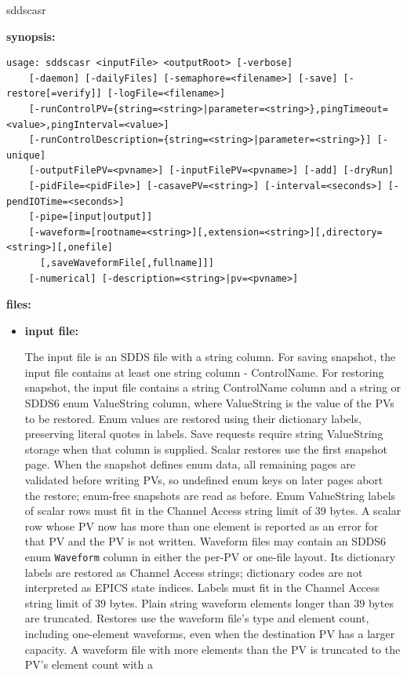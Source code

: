 \begin{sddsprog}{sddscasr}
\item \textbf{synopsis:}
\begin{verbatim}
usage: sddscasr <inputFile> <outputRoot> [-verbose]
    [-daemon] [-dailyFiles] [-semaphore=<filename>] [-save] [-restore[=verify]] [-logFile=<filename>]
    [-runControlPV={string=<string>|parameter=<string>},pingTimeout=<value>,pingInterval=<value>]
    [-runControlDescription={string=<string>|parameter=<string>}] [-unique]
    [-outputFilePV=<pvname>] [-inputFilePV=<pvname>] [-add] [-dryRun]
    [-pidFile=<pidFile>] [-casavePV=<string>] [-interval=<seconds>] [-pendIOTime=<seconds>]
    [-pipe=[input|output]] 
    [-waveform=[rootname=<string>][,extension=<string>][,directory=<string>][,onefile]
      [,saveWaveformFile[,fullname]]]
    [-numerical] [-description=<string>|pv=<pvname>]
\end{verbatim}
\item \textbf{files:}
\begin{itemize}
  \item \textbf{input file:} \par
The input file is an SDDS file with a string column. For saving snapshot, the input file
contains at least one string column - ControlName. For restoring snapshot, the input file
contains a string ControlName column and a string or SDDS6 enum ValueString
column, where ValueString is the value of the PVs to be restored. Enum values
are restored using their dictionary labels, preserving literal quotes in labels.
Save requests require string ValueString storage when that column is supplied.
Scalar restores use the first snapshot page. When the snapshot defines enum
data, all remaining pages are validated before writing PVs, so undefined enum
keys on later pages abort the restore; enum-free snapshots are read as before.
Enum ValueString labels of scalar rows must fit in the Channel Access string
limit of 39 bytes. A scalar row whose PV now has more than one element is
reported as an error for that PV and the PV is not written.
Waveform files may contain an SDDS6 enum {\tt Waveform} column in either
the per-PV or one-file layout. Its dictionary labels are restored as Channel
Access strings; dictionary codes are not interpreted as EPICS state indices.
Labels must fit in the Channel Access string limit of 39 bytes. Plain string
waveform elements longer than 39 bytes are truncated.
Restores use the waveform file's type and element count, including one-element
waveforms, even when the destination PV has a larger capacity. A waveform file
with more elements than the PV is truncated to the PV's element count with a

\end{itemize}
\end{sddsprog}
